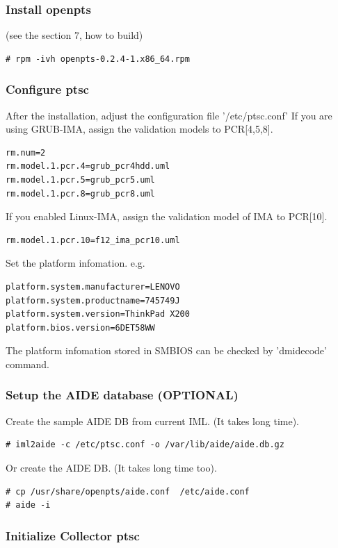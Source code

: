 \subsubsection{Install openpts}

(see the section 7, how to build) \\
\begin{lstlisting}[style=console]
# rpm -ivh openpts-0.2.4-1.x86_64.rpm
\end{lstlisting}

\subsubsection{Configure ptsc}

After the installation, adjust the configuration file '/etc/ptsc.conf'
If you are using GRUB-IMA, assign the validation models to PCR[4,5,8].
\begin{lstlisting}[style=source_code]
rm.num=2
rm.model.1.pcr.4=grub_pcr4hdd.uml
rm.model.1.pcr.5=grub_pcr5.uml
rm.model.1.pcr.8=grub_pcr8.uml
\end{lstlisting}
If you enabled Linux-IMA, assign the validation model of IMA to PCR[10].
\begin{lstlisting}[style=source_code]
rm.model.1.pcr.10=f12_ima_pcr10.uml
\end{lstlisting}
Set the platform infomation. e.g.
\begin{lstlisting}[style=source_code]
platform.system.manufacturer=LENOVO
platform.system.productname=745749J
platform.system.version=ThinkPad X200
platform.bios.version=6DET58WW
\end{lstlisting}
The platform infomation stored in SMBIOS can be checked by 'dmidecode' command.

\subsubsection{Setup the AIDE database (OPTIONAL)}
Create the sample AIDE DB from current IML.
(It takes long time).
\begin{lstlisting}[style=console] 
# iml2aide -c /etc/ptsc.conf -o /var/lib/aide/aide.db.gz
\end{lstlisting}
Or create the AIDE DB.
(It takes long time too).
\begin{lstlisting}[style=console]
# cp /usr/share/openpts/aide.conf  /etc/aide.conf
# aide -i
\end{lstlisting}

\subsubsection{Initialize Collector ptsc}


